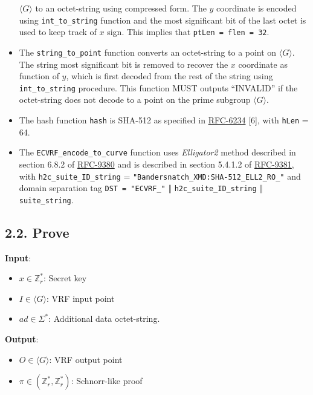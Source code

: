 \documentclass[
]{article}
\providecommand{\tightlist}{%
  \setlength{\itemsep}{0pt}\setlength{\parskip}{0pt}}
\begin{document}
\begin{itemize}
  \(\langle G \rangle\) to an octet-string using compressed form. The
  \(y\) coordinate is encoded using \texttt{int\_to\_string} function
  and the most significant bit of the last octet is used to keep track
  of \(x\) sign. This implies that \texttt{ptLen\ =\ flen\ =\ 32}.
\item
  The \texttt{string\_to\_point} function converts an octet-string to a
  point on \(\langle G \rangle\). The string most significant bit is
  removed to recover the \(x\) coordinate as function of \(y\), which is
  first decoded from the rest of the string using
  \texttt{int\_to\_string} procedure. This function MUST outputs
  ``INVALID'' if the octet-string does not decode to a point on the
  prime subgroup \(\langle G \rangle\).
\item
  The hash function \texttt{hash} is SHA-512 as specified in
  \href{https://datatracker.ietf.org/doc/rfc6234}{RFC-6234} {[}6{]},
  with \texttt{hLen} = 64.
\item
  The \texttt{ECVRF\_encode\_to\_curve} function uses \emph{Elligator2}
  method described in section 6.8.2 of
  \href{https://datatracker.ietf.org/doc/rfc9380}{RFC-9380} and is
  described in section 5.4.1.2 of
  \href{https://datatracker.ietf.org/doc/rfc9381}{RFC-9381}, with
  \texttt{h2c\_suite\_ID\_string} =
  \texttt{"Bandersnatch\_XMD:SHA-512\_ELL2\_RO\_"} and domain separation
  tag \texttt{DST\ =\ "ECVRF\_"} \(\Vert\)
  \texttt{h2c\_suite\_ID\_string} \(\Vert\) \texttt{suite\_string}.
\end{itemize}

\hypertarget{prove}{%
\subsection{2.2. Prove}\label{prove}}

\textbf{Input}:

\begin{itemize}
\tightlist
\item
  \(x \in \mathbb{Z}^*_r\): Secret key
\item
  \(I \in \langle G \rangle\): VRF input point
\item
  \(ad \in \Sigma^*\): Additional data octet-string.
\end{itemize}

\textbf{Output}:

\begin{itemize}
\tightlist
\item
  \(O \in \langle G \rangle\): VRF output point
\item
  \(\pi \in (\mathbb{Z}^*_r, \mathbb{Z}^*_r)\): Schnorr-like proof
\end{itemize}
\end{document}
